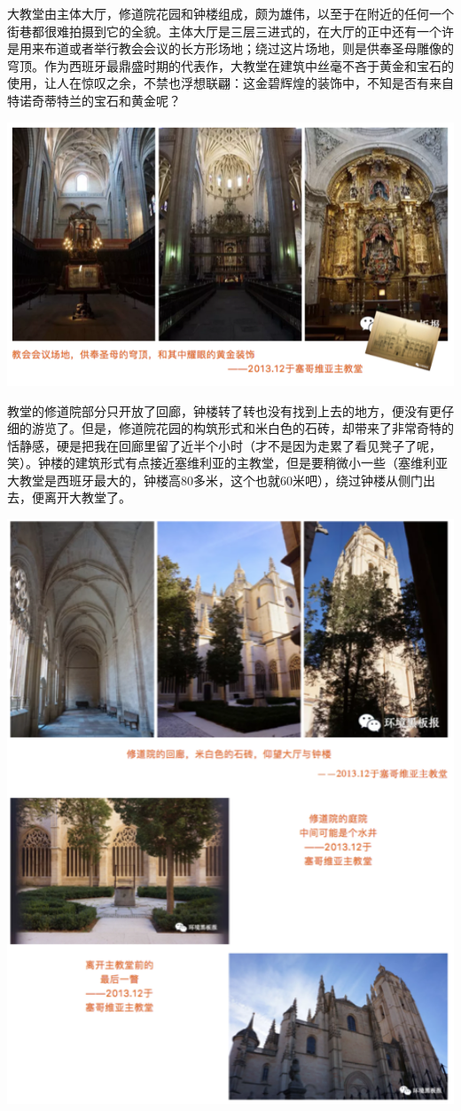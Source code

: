 \documentclass[]{book}
\begin{document}
大教堂由主体大厅，修道院花园和钟楼组成，颇为雄伟，以至于在附近的任何一个街巷都很难拍摄到它的全貌。主体大厅是三层三进式的，在大厅的正中还有一个许是用来布道或者举行教会会议的长方形场地；绕过这片场地，则是供奉圣母雕像的穹顶。作为西班牙最鼎盛时期的代表作，大教堂在建筑中丝毫不吝于黄金和宝石的使用，让人在惊叹之余，不禁也浮想联翩：这金碧辉煌的装饰中，不知是否有来自特诺奇蒂特兰的宝石和黄金呢？

\includegraphics[width=8.33in]{images/xt51}

教堂的修道院部分只开放了回廊，钟楼转了转也没有找到上去的地方，便没有更仔细的游览了。但是，修道院花园的构筑形式和米白色的石砖，却带来了非常奇特的恬静感，硬是把我在回廊里留了近半个小时（才不是因为走累了看见凳子了呢，笑）。钟楼的建筑形式有点接近塞维利亚的主教堂，但是要稍微小一些（塞维利亚大教堂是西班牙最大的，钟楼高80多米，这个也就60米吧），绕过钟楼从侧门出去，便离开大教堂了。

\includegraphics[width=6.38in]{images/xt52}
\end{document}
